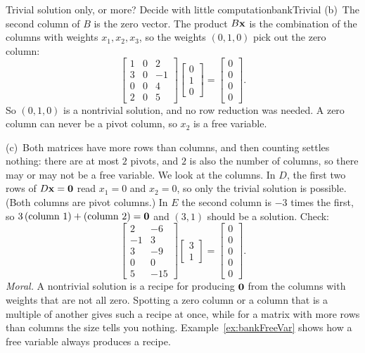 \documentclass[11pt]{article}
\begin{document}
\begin{exmp}{Trivial solution only, or more? Decide with little computation}{bankTrivial}
(b)~The second column of $B$ is the zero vector. The product $B\mathbf{x}$ is the combination of the columns with weights $x_1,x_2,x_3$, so the weights $(0,1,0)$ pick out the zero column:
\[
\begin{bmatrix}1&0&2\\3&0&-1\\0&0&4\\2&0&5\end{bmatrix}\begin{bmatrix}0\\1\\0\end{bmatrix}=\begin{bmatrix}0\\0\\0\\0\end{bmatrix}.
\]
So $(0,1,0)$ is a nontrivial solution, and no row reduction was needed. A zero column can never be a pivot column, so $x_2$ is a free variable.

(c)~Both matrices have more rows than columns, and then counting settles nothing: there are at most $2$ pivots, and $2$ is also the number of columns, so there may or may not be a free variable. We look at the columns. In $D$, the first two rows of $D\mathbf{x}=\mathbf{0}$ read $x_1=0$ and $x_2=0$, so only the trivial solution is possible. (Both columns are pivot columns.) In $E$ the second column is $-3$ times the first, so $3\,(\text{column }1)+(\text{column }2)=\mathbf{0}$ and $(3,1)$ should be a solution. Check:
\[
\begin{bmatrix}2&-6\\-1&3\\3&-9\\0&0\\5&-15\end{bmatrix}\begin{bmatrix}3\\1\end{bmatrix}=\begin{bmatrix}0\\0\\0\\0\\0\end{bmatrix}.
\]
\emph{Moral.} A nontrivial solution is a recipe for producing $\mathbf{0}$ from the columns with weights that are not all zero. Spotting a zero column or a column that is a multiple of another gives such a recipe at once, while for a matrix with more rows than columns the size tells you nothing. Example~\ref{ex:bankFreeVar} shows how a free variable always produces a recipe.
\end{exmp}
\end{document}
